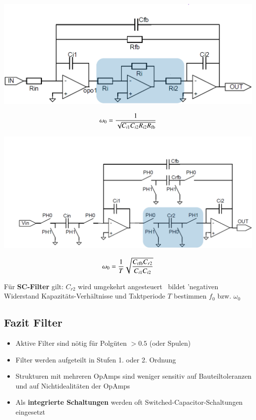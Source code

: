 \begin{minipage}[t]{0.48\columnwidth}
    \begin{center}
        \includegraphics[width=\columnwidth]{images/rc_filter.png}
    \end{center}
    $$ \omega_0 = \frac{1}{\sqrt{C_{i1} C_{i2} R_{i2} R_{\rm fb}}} $$
\end{minipage}
\hfill
\begin{minipage}[t]{0.48\columnwidth}
    \begin{center}
        \includegraphics[width=\columnwidth]{images/sc_filter.png}
    \end{center}

    $$ \omega_0 =  \frac{1}{T} \sqrt{ \frac{C_{\rm rfb} C_{r2}}{ C_{i1} C_{i2}} } $$
\end{minipage}

\begin{outline}
    \1 Für \textbf{SC-Filter} gilt:
        \2 $C_{r2}$ wird umgekehrt angesteuert \textrightarrow\ bildet 'negativen Widerstand
        \2 Kapazitäts-Verhältnisse und Taktperiode $T$ bestimmen $f_0$ bzw. $\omega_0$
\end{outline}

\subsection{Fazit Filter}

\begin{itemize}
    \item Aktive Filter sind nötig für Polgüten $> 0.5$ (oder Spulen)
    \item Filter werden aufgeteilt in Stufen 1. oder 2. Ordnung
    \item Strukturen mit mehreren OpAmps sind weniger sensitiv auf Bauteiltoleranzen und auf Nichtidealitäten der OpAmps
    \item Als \textbf{integrierte Schaltungen} werden oft Switched-Capacitor-Schaltungen eingesetzt
\end{itemize}